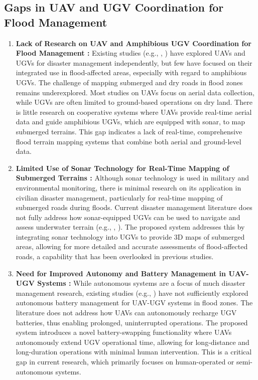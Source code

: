 \documentclass[conference]{IEEEtran}
\begin{document}
\subsection{\textbf{Gaps in UAV and UGV Coordination for Flood Management}}
\begin{enumerate}
    \item \textbf{ Lack of Research on UAV and Amphibious UGV Coordination for Flood Management : }
Existing studies (e.g., \cite{ref20}, \cite{ref22}) have explored UAVs and UGVs for disaster management independently, but few have focused on their integrated use in flood-affected areas, especially with regard to amphibious UGVs. The challenge of mapping submerged and dry roads in flood zones remains underexplored. Most studies on UAVs focus on aerial data collection, while UGVs are often limited to ground-based operations on dry land. There is little research on cooperative systems where UAVs provide real-time aerial data and guide amphibious UGVs, which are equipped with sonar, to map submerged terrains. This gap indicates a lack of real-time, comprehensive flood terrain mapping systems that combine both aerial and ground-level data.
  
	\item \textbf{ Limited Use of Sonar Technology for Real-Time Mapping of Submerged Terrains : }
	Although sonar technology is used in military and environmental monitoring, there is minimal research on its application in civilian disaster management, particularly for real-time mapping of submerged roads during floods. Current disaster management literature does not fully address how sonar-equipped UGVs can be used to navigate and assess underwater terrain (e.g., \cite{ref13}, \cite{ref14}). The proposed system addresses this by integrating sonar technology into UGVs to provide 3D maps of submerged areas, allowing for more detailed and accurate assessments of flood-affected roads, a capability that has been overlooked in previous studies.

	
	\item \textbf{ Need for Improved Autonomy and Battery Management in UAV-UGV Systems : }
While autonomous systems are a focus of much disaster management research, existing studies (e.g., \cite{ref21}) have not sufficiently explored autonomous battery management for UAV-UGV systems in flood zones. The literature does not address how UAVs can autonomously recharge UGV batteries, thus enabling prolonged, uninterrupted operations. The proposed system introduces a novel battery-swapping functionality where UAVs autonomously extend UGV operational time, allowing for long-distance and long-duration operations with minimal human intervention. This is a critical gap in current research, which primarily focuses on human-operated or semi-autonomous systems.
	

\end{enumerate}
\end{document}
